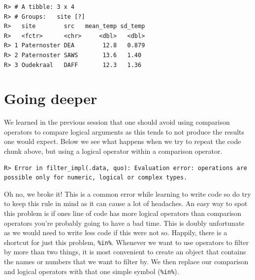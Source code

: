 \documentclass[]{book}
\newenvironment{Shaded}{\begin{snugshade}}{\end{snugshade}}
\newcommand{\KeywordTok}[1]{\textcolor[rgb]{0.13,0.29,0.53}{\textbf{#1}}}
\newcommand{\DataTypeTok}[1]{\textcolor[rgb]{0.13,0.29,0.53}{#1}}
\newcommand{\StringTok}[1]{\textcolor[rgb]{0.31,0.60,0.02}{#1}}
\newcommand{\CommentTok}[1]{\textcolor[rgb]{0.56,0.35,0.01}{\textit{#1}}}
\newcommand{\OtherTok}[1]{\textcolor[rgb]{0.56,0.35,0.01}{#1}}
\newcommand{\OperatorTok}[1]{\textcolor[rgb]{0.81,0.36,0.00}{\textbf{#1}}}
\newcommand{\NormalTok}[1]{#1}
\theoremstyle{definition}
\theoremstyle{definition}
\theoremstyle{definition}
\theoremstyle{remark}
\begin{document}
\begin{verbatim}
R> # A tibble: 3 x 4
R> # Groups:   site [?]
R>   site        src   mean_temp sd_temp
R>   <fctr>      <chr>     <dbl>   <dbl>
R> 1 Paternoster DEA        12.8   0.879
R> 2 Paternoster SAWS       13.6   1.40 
R> 3 Oudekraal   DAFF       12.3   1.36
\end{verbatim}

\section{Going deeper}\label{going-deeper}

We learned in the previous session that one should avoid using
comparison operators to compare logical arguments as this tends to not
produce the results one would expect. Below we see what happens when we
try to repeat the code chunk above, but using a logical operator within
a comparison operator.

\begin{Shaded}
\end{Shaded}

\begin{verbatim}
R> Error in filter_impl(.data, quo): Evaluation error: operations are possible only for numeric, logical or complex types.
\end{verbatim}

Oh no, we broke it! This is a common error while learning to write code
so do try to keep this rule in mind as it can cause a lot of headaches.
An easy way to spot this problem is if ones line of code has more
logical operators than comparison operators you're probably going to
have a bad time. This is doubly unfortunate as we would need to write
less code if this were not so. Happily, there is a shortcut for just
this problem, \texttt{\%in\%}. Whenever we want to use operators to
filter by more than two things, it is most convenient to create an
object that contains the names or numbers that we want to filter by. We
then replace our comparison and logical operators with that one simple
symbol (\texttt{\%in\%}).
\end{document}
